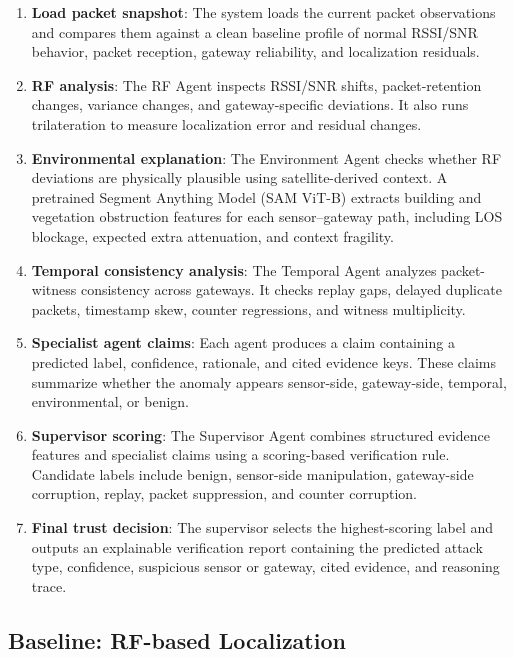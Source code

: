 \documentclass[10pt, twocolumn, letterpaper]{article}
\begin{document}
\begin{enumerate}
    \item \textbf{Load packet snapshot}: The system loads the current packet observations and compares them against a clean baseline profile of normal RSSI/SNR behavior, packet reception, gateway reliability, and localization residuals.

    \item \textbf{RF analysis}: The RF Agent inspects RSSI/SNR shifts, packet-retention changes, variance changes, and gateway-specific deviations. It also runs trilateration to measure localization error and residual changes.

    \item \textbf{Environmental explanation}: The Environment Agent checks whether RF deviations are physically plausible using satellite-derived context. A pretrained Segment Anything Model (SAM ViT-B) extracts building and vegetation obstruction features for each sensor--gateway path, including LOS blockage, expected extra attenuation, and context fragility.

    \item \textbf{Temporal consistency analysis}: The Temporal Agent analyzes packet-witness consistency across gateways. It checks replay gaps, delayed duplicate packets, timestamp skew, counter regressions, and witness multiplicity.

    \item \textbf{Specialist agent claims}: Each agent produces a claim containing a predicted label, confidence, rationale, and cited evidence keys. These claims summarize whether the anomaly appears sensor-side, gateway-side, temporal, environmental, or benign.

    \item \textbf{Supervisor scoring}: The Supervisor Agent combines structured evidence features and specialist claims using a scoring-based verification rule. Candidate labels include benign, sensor-side manipulation, gateway-side corruption, replay, packet suppression, and counter corruption.

    \item \textbf{Final trust decision}: The supervisor selects the highest-scoring label and outputs an explainable verification report containing the predicted attack type, confidence, suspicious sensor or gateway, cited evidence, and reasoning trace.
\end{enumerate}

\subsection{Baseline: RF-based Localization}
\end{document}
